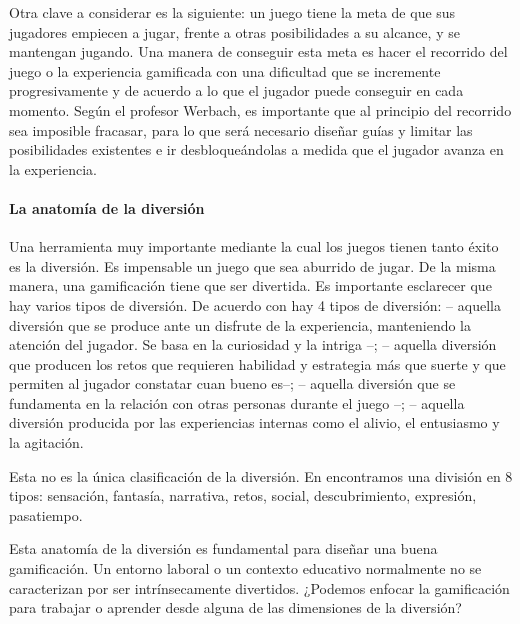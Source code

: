 Otra clave a considerar es la siguiente: un juego tiene la meta de que sus jugadores empiecen a jugar, frente a otras posibilidades a su alcance, y se mantengan jugando.
%
Una manera de conseguir esta meta es hacer el recorrido del juego o la experiencia gamificada con una dificultad que se incremente progresivamente y de acuerdo a lo que el jugador puede conseguir en cada momento. 
%
Según el profesor Werbach, es importante que al principio del recorrido sea imposible fracasar, para lo que será necesario diseñar guías y limitar las posibilidades existentes e ir desbloqueándolas a medida que el jugador avanza en la experiencia.


\paragraph{La anatomía de la diversión}

Una herramienta muy importante mediante la cual los juegos tienen tanto éxito es la diversión.
%
Es impensable un juego que sea aburrido de jugar.
%
De la misma manera, una gamificación tiene que ser divertida.
%
Es importante esclarecer que hay varios tipos de diversión.
%
De acuerdo con  \cite{whyweplaygames} hay 4 tipos de diversión: 
%
 -- aquella diversión que se produce ante un disfrute de la experiencia, manteniendo la atención del jugador. Se basa en la curiosidad y la intriga --;
%
\label{kindsoffun}
  -- aquella diversión que producen los retos que requieren habilidad y estrategia más que suerte y que permiten al jugador constatar cuan bueno es--;
%
 -- aquella diversión que se fundamenta en la relación con otras personas durante el juego --;
%
 -- aquella diversión producida por las experiencias internas como el alivio, el entusiasmo y la agitación.

Esta no es la única clasificación de la diversión.
%
En  \cite{MDA} encontramos una división en 8 tipos: sensación, fantasía, narrativa, retos, social, descubrimiento, expresión, pasatiempo.
%
\label{AnatomyOfFun}
%

Esta anatomía de la diversión es fundamental para diseñar una buena gamificación.
%
Un entorno laboral o un contexto educativo normalmente no se caracterizan por ser intrínsecamente divertidos.
%
¿Podemos enfocar la gamificación para trabajar o aprender desde alguna de las dimensiones de la diversión? 


